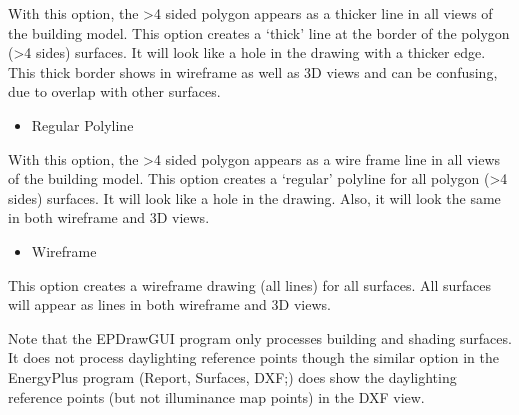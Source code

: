 With this option, the \textgreater{}4 sided polygon appears as a thicker line in all views of the building model. This option creates a `thick' line at the border of the polygon (\textgreater{}4 sides) surfaces. It will look like a hole in the drawing with a thicker edge. This thick border shows in wireframe as well as 3D views and can be confusing, due to overlap with other surfaces.

\begin{itemize}
\tightlist
\item
  Regular Polyline
\end{itemize}

With this option, the \textgreater{}4 sided polygon appears as a wire frame line in all views of the building model. This option creates a `regular' polyline for all polygon (\textgreater{}4 sides) surfaces. It will look like a hole in the drawing. Also, it will look the same in both wireframe and 3D views.

\begin{itemize}
\tightlist
\item
  Wireframe
\end{itemize}

This option creates a wireframe drawing (all lines) for all surfaces. All surfaces will appear as lines in both wireframe and 3D views.

Note that the EPDrawGUI program only processes building and shading surfaces. It does not process daylighting reference points though the similar option in the EnergyPlus program (Report, Surfaces, DXF;) does show the daylighting reference points (but not illuminance map points) in the DXF view.
